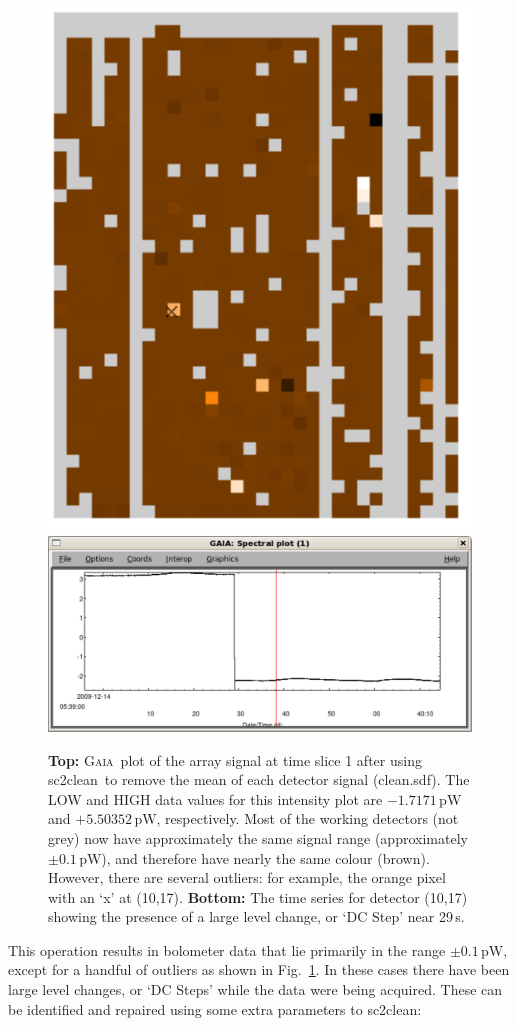 \documentclass[twoside,11pt]{article}
\newcommand{\xref}[3]{#1}
\renewcommand{\_}{\texttt{\symbol{95}}}
\newcommand{\gaia}{\xref{\textsc{Gaia}}{sun214}{}}
\newcommand{\task}[1]{\textsf{#1}}
\newcommand{\clean}{\xref{\task{sc2clean}}{sun258}{SC2CLEAN}}
\begin{document}
\begin{figure}
\begin{center}
\includegraphics[width=0.5\linewidth]{sc19_array_mean}
\includegraphics[width=0.9\linewidth]{sc19_dcstep}
\caption{{\bf Top:} \gaia\ plot of the array signal at time slice 1
  after using \clean\ to remove the mean of each detector signal
  (clean.sdf). The LOW and HIGH data values for this intensity plot
  are $-1.7171$\,pW and $+5.50352$\,pW, respectively. Most of the
  working detectors (not grey) now have approximately the same signal
  range (approximately $\pm 0.1$\,pW), and therefore have nearly the
  same colour (brown). However, there are several outliers: for
  example, the orange pixel with an `x' at (10,17). {\bf Bottom:} The
  time series for detector (10,17) showing the presence of a large
  level change, or `DC Step' near 29\,s.}
\label{fig:array_mean}
\end{center}
\end{figure}

This operation results in bolometer data that lie primarily in the
range $\pm 0.1$\,pW, except for a handful of outliers as shown in
Fig.~\ref{fig:array_mean}. In these cases there have been large level
changes, or `DC Steps' while the data were being acquired. These can
be identified and repaired using some extra parameters to \clean:
\end{document}
